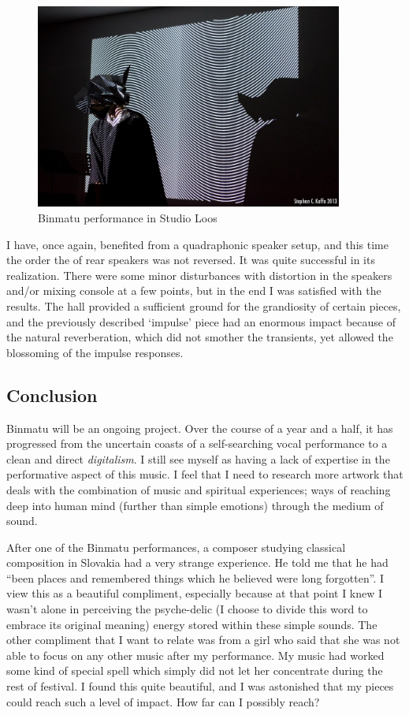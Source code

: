\documentclass[12pt,a4paper,oneside]{report}
\begin{document}
\begin{figure}  
  \centering
    \includegraphics[width=0.9\textwidth]{img/binmatu_perfo}
        \caption{Binmatu performance in Studio Loos}
        \label{fig:binmatu_perfo}
\end{figure}

I have, once again, benefited from a quadraphonic speaker setup, and this time the order the of rear speakers was not reversed. It was quite successful in its realization. There were some minor disturbances with distortion in the speakers and/or mixing console at a few points, but in the end I was satisfied with the results. The hall provided a sufficient ground for the grandiosity of certain pieces, and the previously described `impulse' piece had an enormous impact because of the natural reverberation, which did not smother the transients, yet allowed the blossoming of the impulse responses.

\subsection{Conclusion}

Binmatu will be an ongoing project. Over the course of a year and a half, it has progressed from the uncertain coasts of a self-searching vocal performance to a clean and direct \emph{digitalism}. I still see myself as having a lack of expertise in the performative aspect of this music. I feel that I need to research more artwork that deals with the combination of music and spiritual experiences; ways of reaching deep into human mind (further than simple emotions) through the medium of sound. 

After one of the Binmatu performances, a composer studying classical composition in Slovakia had a very strange experience. He told me that he had ``been places and remembered things which he believed were long forgotten''. I view this as a beautiful compliment, especially because at that point I knew I wasn't alone in perceiving the psyche-delic (I choose to divide this word to embrace its original meaning) energy stored within these simple sounds. The other compliment that I want to relate was from a girl who said that she was not able to focus on any other music after my performance. My music had worked some kind of special spell which simply did not let her concentrate during the rest of festival. I found this quite beautiful, and I was astonished that my pieces could reach such a level of impact. How far can I possibly reach?
\end{document}
